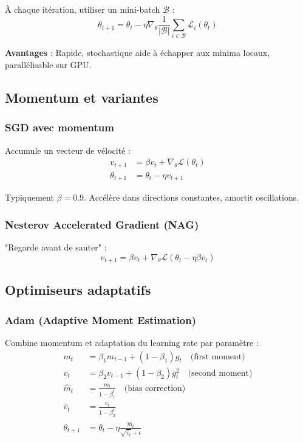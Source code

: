 À chaque itération, utiliser un mini-batch $\mathcal{B}$ :
\[
\theta_{t+1} = \theta_t - \eta \nabla_\theta \frac{1}{|\mathcal{B}|} \sum_{i \in \mathcal{B}} \mathcal{L}_i(\theta_t)
\]

\textbf{Avantages} : Rapide, stochastique aide à échapper aux minima locaux, parallélisable sur GPU.

\subsection{Momentum et variantes}

\subsubsection{SGD avec momentum}

Accumule un vecteur de vélocité :
\begin{align*}
v_{t+1} &= \beta v_t + \nabla_\theta \mathcal{L}(\theta_t) \\
\theta_{t+1} &= \theta_t - \eta v_{t+1}
\end{align*}

Typiquement $\beta = 0.9$. Accélère dans directions constantes, amortit oscillations.

\subsubsection{Nesterov Accelerated Gradient (NAG)}

"Regarde avant de sauter" :
\[
v_{t+1} = \beta v_t + \nabla_\theta \mathcal{L}(\theta_t - \eta \beta v_t)
\]

\subsection{Optimiseurs adaptatifs}

\subsubsection{Adam (Adaptive Moment Estimation)}

Combine momentum et adaptation du learning rate par paramètre :
\begin{align*}
m_t &= \beta_1 m_{t-1} + (1-\beta_1) g_t \quad \text{(first moment)} \\
v_t &= \beta_2 v_{t-1} + (1-\beta_2) g_t^2 \quad \text{(second moment)} \\
\hat{m}_t &= \frac{m_t}{1 - \beta_1^t} \quad \text{(bias correction)} \\
\hat{v}_t &= \frac{v_t}{1 - \beta_2^t} \\
\theta_{t+1} &= \theta_t - \eta \frac{\hat{m}_t}{\sqrt{\hat{v}_t} + \epsilon}
\end{align*}

